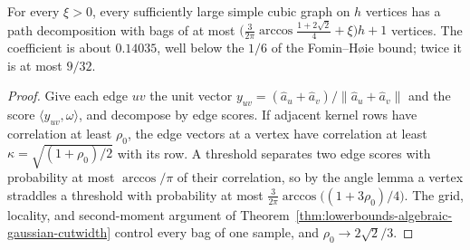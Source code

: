 \begin{theorem}
  \label{thm:lowerbounds-algebraic-gaussian-pathwidth}
  \leanok
  For every $\xi>0$, every sufficiently large simple cubic graph on $h$ vertices
  has a path decomposition with bags of at most
  $\bigl(\tfrac{3}{2\pi}\arccos\tfrac{1+2\sqrt2}{4}+\xi\bigr)h+1$ vertices. The
  coefficient is about $0.14035$, well below the $1/6$ of the Fomin--H{\o}ie bound;
  twice it is at most $9/32$.
\end{theorem}
\begin{proof}
  \leanok
  Give each edge $uv$ the unit vector $y_{uv}=(\hat a_u+\hat a_v)/\lVert\hat a_u+\hat a_v\rVert$
  and the score $\langle y_{uv},\omega\rangle$, and decompose by edge scores. If
  adjacent kernel rows have correlation at least $\rho_0$, the edge vectors at a
  vertex have correlation at least $\kappa=\sqrt{(1+\rho_0)/2}$ with its row. A
  threshold separates two edge scores with probability at most $\arccos/\pi$ of their
  correlation, so by the angle lemma a vertex straddles a threshold with probability at
  most $\tfrac{3}{2\pi}\arccos\bigl((1+3\rho_0)/4\bigr)$.
  The grid, locality, and second-moment argument of
  Theorem~\ref{thm:lowerbounds-algebraic-gaussian-cutwidth} control every bag of one
  sample, and $\rho_0\to2\sqrt2/3$.
\end{proof}

